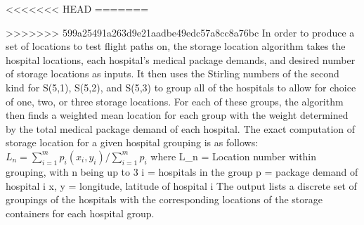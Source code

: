 <<<<<<< HEAD
=======


>>>>>>> 599a25491a263d9e21aadbe49edc57a8cc8a76bc
	In order to produce a set of locations to test flight paths on, the storage location algorithm takes the hospital locations, each hospital's medical package demands, and desired number of storage locations as inputs. It then uses the Stirling numbers of the second kind for S(5,1), S(5,2), and S(5,3) to group all of the hospitals to allow for choice of one, two, or three storage locations. For each of these groups, the algorithm then finds a weighted mean location for each group with the weight determined by the total medical package demand of each hospital.  The exact computation of storage location for a given hospital grouping is as follows:
	$ L_n = \sum_{i=1}^{m} p_i(x_i, y_i) / \sum_{i=1}^{m} p_i $
	where L_n = Location number within grouping, with n being up to 3
		i = hospitals in the group
		p = package demand of hospital i
		x, y = longitude, latitude of hospital i
The output lists a discrete set of groupings of the hospitals with the corresponding locations of the storage containers for each hospital group.	